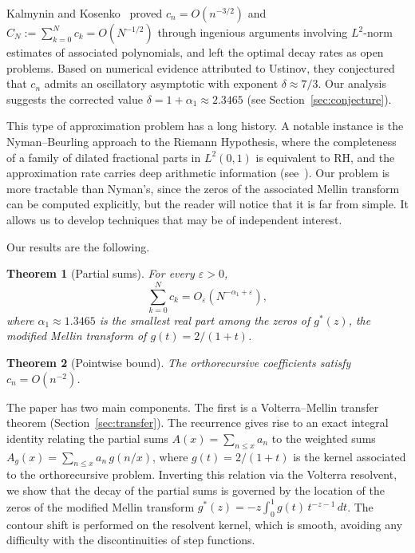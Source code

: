 \documentclass[11pt]{amsart}
\newtheorem{theorem}{Theorem}[section]
\theoremstyle{definition}
\theoremstyle{remark}
\newcommand{\eps}{\varepsilon}
\begin{document}
Kalmynin and Kosenko~\cite{KalKos} proved $c_n = O(n^{-3/2})$ and $C_N := \sum_{k=0}^{N} c_k = O(N^{-1/2})$ through ingenious arguments involving $L^2$-norm estimates of associated polynomials, and left the optimal decay rates as open problems. Based on numerical evidence attributed to Ustinov, they conjectured that $c_n$ admits an oscillatory asymptotic with exponent $\delta \approx 7/3$. Our analysis suggests the corrected value $\delta = 1 + \alpha_1 \approx 2.3465$ (see Section~\ref{sec:conjecture}).

This type of approximation problem has a long history. A notable instance is the Nyman--Beurling approach to the Riemann Hypothesis, where the completeness of a family of dilated fractional parts in $L^2(0,1)$ is equivalent to RH, and the approximation rate carries deep arithmetic information (see~\cite{Nyman, Beurling, BaezDuarte}). Our problem is more tractable than Nyman's, since the zeros of the associated Mellin transform can be computed explicitly, but the reader will notice that it is far from simple. It allows us to develop techniques that may be of independent interest.

Our results are the following.

\begin{theorem}[Partial sums]\label{thm:main}
For every $\eps > 0$,
$$
\sum_{k=0}^{N} c_k = O_\eps(N^{-\alpha_1+\eps}),
$$
where $\alpha_1 \approx 1.3465$ is the smallest real part among the zeros of $g^*(z)$, the modified Mellin transform of $g(t) = 2/(1+t)$.
\end{theorem}

\begin{theorem}[Pointwise bound]\label{thm:pointwise}
The orthorecursive coefficients satisfy $c_n = O(n^{-2})$.
\end{theorem}

The paper has two main components. The first is a Volterra--Mellin transfer theorem (Section~\ref{sec:transfer}). The recurrence gives rise to an exact integral identity relating the partial sums $A(x) = \sum_{n \leq x} a_n$ to the weighted sums $A_g(x) = \sum_{n \leq x} a_n\, g(n/x)$, where $g(t) = 2/(1+t)$ is the kernel associated to the orthorecursive problem. Inverting this relation via the Volterra resolvent, we show that the decay of the partial sums is governed by the location of the zeros of the modified Mellin transform $g^*(z) = -z\int_0^1 g(t)\, t^{-z-1}\, dt$. The contour shift is performed on the resolvent kernel, which is smooth, avoiding any difficulty with the discontinuities of step functions.
\end{document}

